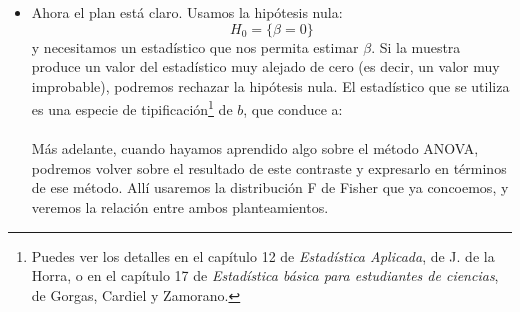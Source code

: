 \begin{itemize}
    \item Ahora el plan está claro. Usamos la hipótesis nula:
    \[H_0=\{\beta=0\}\]
    y necesitamos un estadístico que nos permita estimar $\beta$. Si la muestra produce un valor del estadístico muy alejado de cero (es decir, un valor muy improbable), podremos rechazar la hipótesis nula. El estadístico que se utiliza es una especie de tipificación\footnote{Puedes ver los detalles en el capítulo 12 de {\em Estadística Aplicada}, de J. de la Horra, o en el capítulo 17 de {\em Estadística básica para estudiantes de ciencias}, de Gorgas, Cardiel y Zamorano.} de $b$, que conduce a:\\[3mm]
    \\[3mm]
    Más adelante, cuando hayamos aprendido algo sobre el método ANOVA, podremos volver sobre el resultado de este contraste y expresarlo en términos de ese método. Allí usaremos la distribución F de Fisher que ya concoemos, y veremos la relación entre ambos planteamientos.


\end{itemize}

